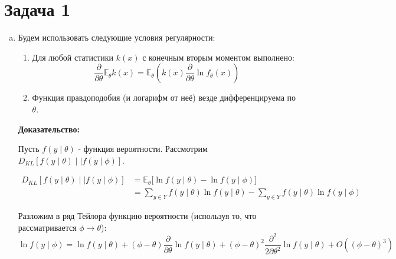 \documentclass[12pt,letterpaper]{article}
\begin{document}
\section*{Задача 1}

\begin{enumerate} [a)]
    \item
    {
        Будем использовать следующие условия регулярности:
        \begin{enumerate} [1.]
            \item Для любой статистики $k(x)$ с конечным вторым моментом выполнено: $$\frac{\partial}{\partial \theta} \mathbb{E}_{\theta}k(x) = \mathbb{E}_{\theta}(k(x) \frac{\partial}{\partial \theta}\ln f_{\theta}(x))$$
            \item Функция правдоподобия (и логарифм от неё) везде дифференцируема по $\theta$.
        \end{enumerate}

        \textbf{Доказательство:}

        Пусть $f(y \mid \theta)$ - функция вероятности. Рассмотрим $D_{KL}[f(y \mid \theta) \mid\mid f(y \mid \phi)]$.

        \begin{equation}
            \begin{split}
                D_{KL}[f(y \mid \theta) \mid\mid f(y \mid \phi)] & = \mathbb{E}_{\theta}\big[\ln f(y\mid\theta) - \ln f(y\mid\phi)\big] \\
                &  = \sum\limits_{y \in Y}f(y\mid\theta)\ln f(y\mid\theta) - \sum\limits_{y \in Y}f(y\mid\theta)\ln f(y\mid\phi)
            \end{split}
        \end{equation}

        Разложим в ряд Тейлора функцию вероятности (используя то, что рассматривается $\phi \rightarrow \theta$):
        \begin{equation}
            \ln{f(y \mid \phi)} = \ln{f(y \mid \theta)} + (\phi - \theta) \frac{\partial}{\partial \theta} \ln{f(y \mid \theta)} + (\phi - \theta)^2 \frac{\partial^2}{2 \partial \theta^2}\ln{f(y \mid\theta)} + O((\phi-\theta)^3)  
        \end{equation}

}
\end{enumerate}
\end{document}
